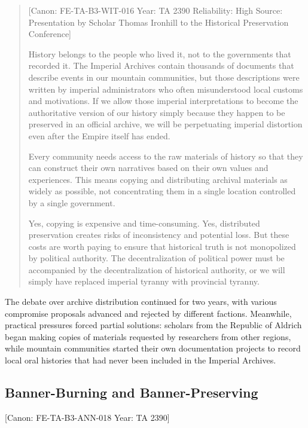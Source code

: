 \begin{quote}
{[}Canon: FE-TA-B3-WIT-016 \textbar{} Year: TA 2390 \textbar{}
Reliability: High \textbar{} Source: Presentation by Scholar Thomas
Ironhill to the Historical Preservation Conference{]}

History belongs to the people who lived it, not to the governments that
recorded it. The Imperial Archives contain thousands of documents that
describe events in our mountain communities, but those descriptions were
written by imperial administrators who often misunderstood local customs
and motivations. If we allow those imperial interpretations to become
the authoritative version of our history simply because they happen to
be preserved in an official archive, we will be perpetuating imperial
distortion even after the Empire itself has ended.

Every community needs access to the raw materials of history so that
they can construct their own narratives based on their own values and
experiences. This means copying and distributing archival materials as
widely as possible, not concentrating them in a single location
controlled by a single government.

Yes, copying is expensive and time-consuming. Yes, distributed
preservation creates risks of inconsistency and potential loss. But
these costs are worth paying to ensure that historical truth is not
monopolized by political authority. The decentralization of political
power must be accompanied by the decentralization of historical
authority, or we will simply have replaced imperial tyranny with
provincial tyranny.
\end{quote}

The debate over archive distribution continued for two years, with
various compromise proposals advanced and rejected by different
factions. Meanwhile, practical pressures forced partial solutions:
scholars from the Republic of Aldrich began making copies of materials
requested by researchers from other regions, while mountain communities
started their own documentation projects to record local oral histories
that had never been included in the Imperial Archives.

\subsection{Banner-Burning and
Banner-Preserving}\label{banner-burning-and-banner-preserving}

{[}Canon: FE-TA-B3-ANN-018 \textbar{} Year: TA 2390{]}

